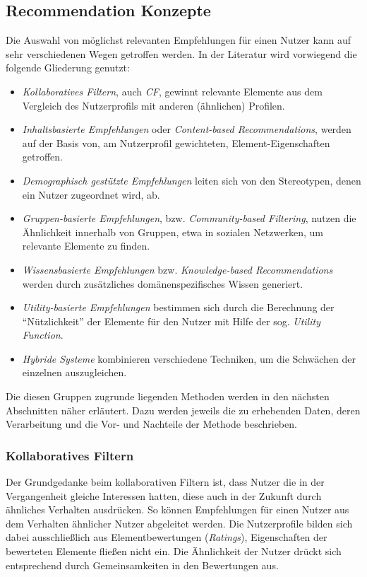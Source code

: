 \subsection{Recommendation Konzepte}\label{sec:concept}\label{sec:collaborativefiltering}
Die Auswahl von möglichst relevanten Empfehlungen für einen Nutzer kann auf sehr verschiedenen Wegen getroffen werden. In der Literatur wird vorwiegend die folgende Gliederung genutzt:  \citep[Kap. 1]{hb} \citep{Burke:2002:HRS:586321.586352} \citep{rs}

\begin{itemize}
\item \textit{Kollaboratives Filtern}, auch \textit{\acf{CF}}, gewinnt relevante Elemente aus dem Vergleich des Nutzerprofils mit anderen  (ähnlichen) Profilen.
\item \textit{Inhaltsbasierte Empfehlungen} oder \textit{Content-based Recommendations}, werden auf der Basis von, am Nutzerprofil gewichteten, Element-Eigenschaften getroffen.
\item \textit{Demographisch gestützte Empfehlungen} leiten sich von den Stereotypen, denen ein Nutzer zugeordnet wird, ab.
\item \textit{Gruppen-basierte Empfehlungen}, bzw. \textit{Community-based Filtering}, nutzen die Ähnlichkeit innerhalb von Gruppen, etwa in sozialen Netzwerken, um relevante Elemente zu finden.
\item \textit{Wissensbasierte Empfehlungen} bzw. \textit{Knowledge-based Recommendations} werden durch zusätzliches domänenspezifisches Wissen generiert.
\item \textit{Utility-basierte Empfehlungen} bestimmen sich durch die Berechnung der ``Nützlichkeit'' der Elemente für den Nutzer mit Hilfe der sog. \textit{Utility Function}.
\item \textit{Hybride Systeme} kombinieren verschiedene Techniken, um die Schwächen der einzelnen auszugleichen.
\end{itemize}

Die diesen Gruppen zugrunde liegenden Methoden werden in den nächsten Abschnitten näher erläutert. Dazu werden jeweils die zu erhebenden Daten, deren Verarbeitung und die Vor- und Nachteile der Methode beschrieben. %

\subsubsection{Kollaboratives Filtern}
\label{sec:cf_overview}
Der Grundgedanke beim kollaborativen Filtern ist, dass Nutzer die in der Vergangenheit gleiche Interessen hatten, diese auch in der Zukunft durch ähnliches Verhalten ausdrücken. So können Empfehlungen für einen Nutzer aus dem Verhalten ähnlicher Nutzer abgeleitet werden. Die Nutzerprofile bilden sich dabei ausschließlich aus Elementbewertungen (\textit{Ratings}), Eigenschaften der bewerteten Elemente fließen nicht ein.  Die Ähnlichkeit der Nutzer drückt sich entsprechend durch Gemeinsamkeiten in den Bewertungen aus. \citep[Kap. 2]{rs}

